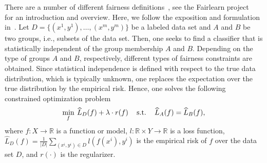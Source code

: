 \documentclass[letterpaper]{article} %
\DeclareMathOperator{\st}{s.t.}
\newcommand{\setR}{\mathbb{R}}
\begin{document}
There are a number of different fairness definitions~\cite{AgarwalBD0W18,barocas-hardt-narayanan,DoniniOBSP18}, see the Fairlearn project~\cite{bird2020fairlearn, fairlearn} for an introduction and overview. Here, we follow the exposition and formulation in~\cite{DoniniOBSP18}. Let $D=\{(x^1, y^1), \ldots, (x^m, y^m)\}$ be a labeled data set and $A$ and $B$ be two groups, i.e., subsets of the data set. Then, one seeks to find a classifier that is statistically independent of the group membership $A$ and $B$. %
Depending on the type of groups $A$ and $B$, respectively, different types of fairness constraints are obtained. Since statistical independence is defined with respect to the true data distribution, which is typically unknown, one replaces the expectation over the true distribution by the empirical risk.
Hence, one solves the following constrained optimization problem
\[
\min_{f}\: \widehat L_D(f) + \lambda \cdot r(f)\\
  \quad \st\quad \widehat L_A (f) = \widehat L_B (f),
\]
where $f\colon X\to\setR$ is a function or model, $l\colon \setR\times Y\to \setR$  is a loss function, $\widehat L_D(f) = \frac{1}{|D|} \sum_{(x^i, y^i) \in D} l(f(x^i), y^i)$ is the empirical risk of $f$ over the data set $D$, and $r(\cdot )$ is the regularizer. %
\end{document}
